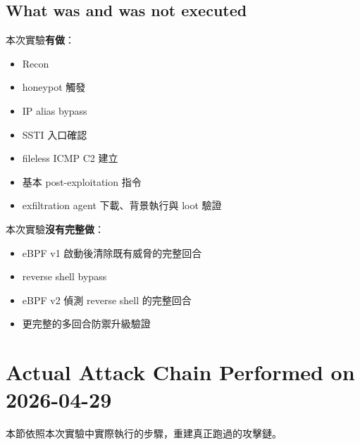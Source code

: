 \documentclass[UTF8,11pt]{ctexart}
\begin{document}
\subsection{What was and was not executed}
本次實驗\textbf{有做}：
\begin{itemize}[leftmargin=*]
  \item Recon
  \item honeypot 觸發
  \item IP alias bypass
  \item SSTI 入口確認
  \item fileless ICMP C2 建立
  \item 基本 post-exploitation 指令
  \item exfiltration agent 下載、背景執行與 loot 驗證
\end{itemize}

本次實驗\textbf{沒有完整做}：
\begin{itemize}[leftmargin=*]
  \item eBPF v1 啟動後清除既有威脅的完整回合
  \item reverse shell bypass
  \item eBPF v2 偵測 reverse shell 的完整回合
  \item 更完整的多回合防禦升級驗證
\end{itemize}

\section{Actual Attack Chain Performed on 2026-04-29}

本節依照本次實驗中實際執行的步驟，重建真正跑過的攻擊鏈。
\end{document}
